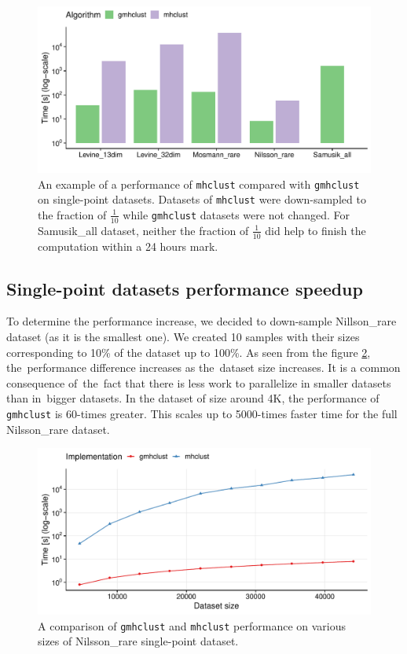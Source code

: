 \begin{figure}\centering
	\includegraphics[width=\linewidth]{img/mixed_perf_comp}
	\caption{An example of a  performance of \texttt{mhclust} compared with \texttt{gmhclust} on single-point datasets. Datasets of \texttt{mhclust} were down-sampled to the fraction of $\frac{1}{10}$ while \texttt{gmhclust} datasets were not changed. For Samusik\_all dataset, neither the fraction of $\frac{1}{10}$ did help to finish the computation within a 24 hours mark. }
	\label{fig04:fract_comp}
\end{figure}

\subsection{Single-point datasets performance speedup}

To determine the performance increase, we decided to down-sample Nillson\_rare dataset (as it is the smallest one). We created 10 samples with their sizes corresponding to 10\% of the dataset up to 100\%.
As seen from the figure \ref{fig04:single_perf}, the~performance difference increases as the~dataset size increases. It is a common consequence of~the~fact that there is less work to parallelize in smaller datasets than in~bigger datasets. In the dataset of size around 4K, the performance of \texttt{gmhclust} is 60-times greater. This scales up to 5000-times faster time for the full Nilsson\_rare dataset.

\begin{figure}\centering
	\includegraphics[width=\linewidth]{img/single_perf_comp}
	\caption{A comparison of \texttt{gmhclust} and \texttt{mhclust} performance on various sizes of Nilsson\_rare single-point dataset.}
	\label{fig04:single_perf}
\end{figure}

